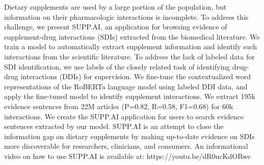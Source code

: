 Dietary supplements are used by a large portion of the population, but information on their pharmacologic interactions is incomplete. To address this challenge, we present SUPP.AI, an application for browsing evidence of supplement-drug interactions (SDIs) extracted from the biomedical literature. We train a model to automatically extract supplement information and identify such interactions from the scientific literature. To address the lack of labeled data for SDI identification, we use labels of the closely related task of identifying drug-drug interactions (DDIs) for supervision. We fine-tune the contextualized word representations of the RoBERTa language model using labeled DDI data, and apply the fine-tuned model to identify supplement interactions. We extract 195k evidence sentences from 22M articles (P=0.82, R=0.58, F1=0.68) for 60k interactions. We create the SUPP.AI application for users to search evidence sentences extracted by our model. SUPP.AI is an attempt to close the information gap on dietary supplements by making up-to-date evidence on SDIs more discoverable for researchers, clinicians, and consumers. An informational video on how to use SUPP.AI is available at: https://youtu.be/dR0ucKdORwc
